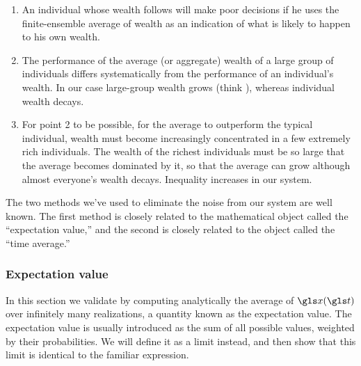 \begin{enumerate}
\item
An individual whose wealth follows  will make poor decisions if he uses the 
finite-ensemble average of wealth as an indication of what is likely to happen to his own wealth.
\item
The performance of the average (or aggregate) wealth of a large group of individuals differs systematically from 
the performance of an individual's wealth. In our case large-group wealth grows (think \GDP), whereas 
individual wealth decays.
\item
For point 2 to be possible, \ie for the average to outperform the typical individual, wealth must 
become increasingly concentrated in a 
few extremely rich individuals. The wealth of the richest individuals must be so large that the average becomes 
dominated by it, so that the average can grow although almost everyone's wealth decays. Inequality 
increases in our system.
\end{enumerate}

The two methods we've used to eliminate the noise from our system
are well known. The first method is closely related to the mathematical object called the
``expectation value,'' and the second is closely related to the object called the ``time average.''

\subsubsection{Expectation value}
In this section we validate  by computing analytically the
average of $\x(\t)$ over infinitely many realizations, a quantity known as the expectation value.
The expectation value is usually introduced as the sum of all possible values, 
weighted by their probabilities. We will define it as a limit instead, and then
show that this limit is identical to the familiar expression.

